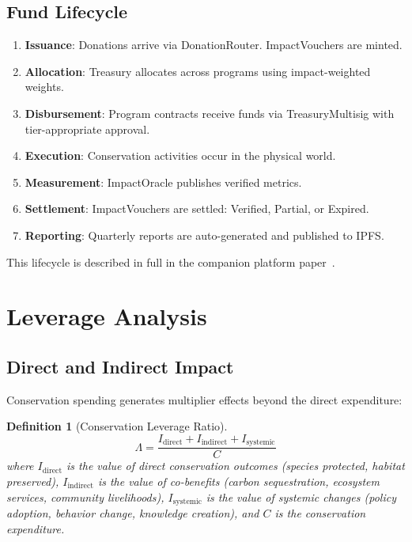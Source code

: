 \documentclass[11pt,letterpaper]{article}
\newtheorem{definition}{Definition}[section]
\begin{document}
\subsection{Fund Lifecycle}

\begin{enumerate}
    \item \textbf{Issuance}: Donations arrive via DonationRouter. ImpactVouchers are minted.
    \item \textbf{Allocation}: Treasury allocates across programs using impact-weighted weights.
    \item \textbf{Disbursement}: Program contracts receive funds via TreasuryMultisig with tier-appropriate approval.
    \item \textbf{Execution}: Conservation activities occur in the physical world.
    \item \textbf{Measurement}: ImpactOracle publishes verified metrics.
    \item \textbf{Settlement}: ImpactVouchers are settled: Verified, Partial, or Expired.
    \item \textbf{Reporting}: Quarterly reports are auto-generated and published to IPFS.
\end{enumerate}

This lifecycle is described in full in the companion platform paper~\cite{zoofundplatform2025}.

\section{Leverage Analysis}
\label{sec:leverage}

\subsection{Direct and Indirect Impact}

Conservation spending generates multiplier effects beyond the direct expenditure:

\begin{definition}[Conservation Leverage Ratio]
\begin{equation}
    \Lambda = \frac{I_{\text{direct}} + I_{\text{indirect}} + I_{\text{systemic}}}{C}
\end{equation}
where $I_{\text{direct}}$ is the value of direct conservation outcomes (species protected, habitat preserved), $I_{\text{indirect}}$ is the value of co-benefits (carbon sequestration, ecosystem services, community livelihoods), $I_{\text{systemic}}$ is the value of systemic changes (policy adoption, behavior change, knowledge creation), and $C$ is the conservation expenditure.
\end{definition}
\end{document}
